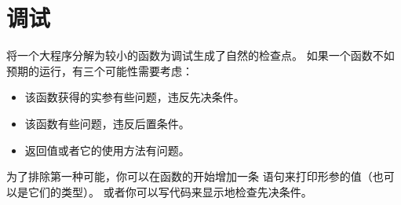 \section{调试}
\label{factdebug}


将一个大程序分解为较小的函数为调试生成了自然的检查点。
如果一个函数不如预期的运行，有三个可能性需要考虑：


\begin{itemize}


\item 该函数获得的实参有些问题，违反先决条件。


\item 该函数有些问题，违反后置条件。


\item 返回值或者它的使用方法有问题。

\end{itemize}


为了排除第一种可能，你可以在函数的开始增加一条  语句来打印形参的值（也可以是它们的类型）。
或者你可以写代码来显示地检查先决条件。
  


